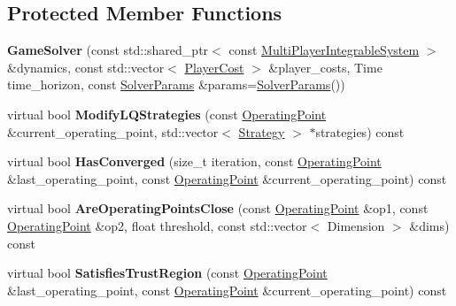 \subsection*{Protected Member Functions}
\begin{DoxyCompactItemize}
\item 
{\bfseries Game\+Solver} (const std\+::shared\+\_\+ptr$<$ const \hyperlink{classilqgames_1_1_multi_player_integrable_system}{Multi\+Player\+Integrable\+System} $>$ \&dynamics, const std\+::vector$<$ \hyperlink{classilqgames_1_1_player_cost}{Player\+Cost} $>$ \&player\+\_\+costs, Time time\+\_\+horizon, const \hyperlink{structilqgames_1_1_solver_params}{Solver\+Params} \&params=\hyperlink{structilqgames_1_1_solver_params}{Solver\+Params}())\hypertarget{classilqgames_1_1_game_solver_a89a591bb5d9fcefc28157a54b016a4d1}{}\label{classilqgames_1_1_game_solver_a89a591bb5d9fcefc28157a54b016a4d1}

\item 
virtual bool {\bfseries Modify\+L\+Q\+Strategies} (const \hyperlink{structilqgames_1_1_operating_point}{Operating\+Point} \&current\+\_\+operating\+\_\+point, std\+::vector$<$ \hyperlink{structilqgames_1_1_strategy}{Strategy} $>$ $\ast$strategies) const \hypertarget{classilqgames_1_1_game_solver_a02461f67e30de7a1fa44c72160c47fb6}{}\label{classilqgames_1_1_game_solver_a02461f67e30de7a1fa44c72160c47fb6}

\item 
virtual bool {\bfseries Has\+Converged} (size\+\_\+t iteration, const \hyperlink{structilqgames_1_1_operating_point}{Operating\+Point} \&last\+\_\+operating\+\_\+point, const \hyperlink{structilqgames_1_1_operating_point}{Operating\+Point} \&current\+\_\+operating\+\_\+point) const \hypertarget{classilqgames_1_1_game_solver_a41c295d2bd647104daf98e8792d438e9}{}\label{classilqgames_1_1_game_solver_a41c295d2bd647104daf98e8792d438e9}

\item 
virtual bool {\bfseries Are\+Operating\+Points\+Close} (const \hyperlink{structilqgames_1_1_operating_point}{Operating\+Point} \&op1, const \hyperlink{structilqgames_1_1_operating_point}{Operating\+Point} \&op2, float threshold, const std\+::vector$<$ Dimension $>$ \&dims) const \hypertarget{classilqgames_1_1_game_solver_a98a3abcc7548e8c8ba26ec3e703668fa}{}\label{classilqgames_1_1_game_solver_a98a3abcc7548e8c8ba26ec3e703668fa}

\item 
virtual bool {\bfseries Satisfies\+Trust\+Region} (const \hyperlink{structilqgames_1_1_operating_point}{Operating\+Point} \&last\+\_\+operating\+\_\+point, const \hyperlink{structilqgames_1_1_operating_point}{Operating\+Point} \&current\+\_\+operating\+\_\+point) const \hypertarget{classilqgames_1_1_game_solver_a8d130435ee6d534d1d93251b00416dee}{}\label{classilqgames_1_1_game_solver_a8d130435ee6d534d1d93251b00416dee}


\end{DoxyCompactItemize}
